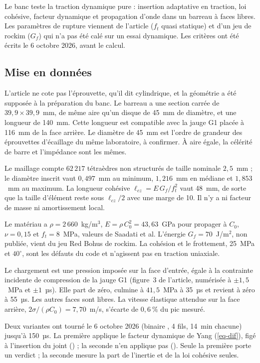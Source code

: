 Le banc teste la traction dynamique pure : insertion adaptative en traction, loi cohésive, facteur dynamique et propagation d'onde dans un barreau à faces libres. Les paramètres de rupture viennent de l'article ($f_t$ quasi statique) et d'un jeu de rockim ($G_f$) qui n'a pas été calé sur un essai dynamique. Les critères ont été écrits le 6 octobre 2026, avant le calcul.

\subsection{Mise en données}

L'article ne cote pas l'éprouvette, qu'il dit cylindrique, et la géométrie a été supposée à la préparation du banc. Le barreau a une section carrée de $39{,}9 \times 39{,}9$~mm, de même aire qu'un disque de 45~mm de diamètre, et une longueur de 140~mm. Cette longueur est compatible avec la jauge G1 placée à 116~mm de la face arrière. Le diamètre de 45~mm est l'ordre de grandeur des éprouvettes d'écaillage du même laboratoire, à confirmer. À aire égale, la célérité de barre et l'impédance sont les mêmes.

Le maillage compte $62\,217$ tétraèdres non structurés de taille nominale $2{,}5$~mm ; le diamètre inscrit vaut $0{,}497$~mm au minimum, $1{,}216$~mm en médiane et $1{,}853$~mm au maximum. La longueur cohésive $\ell_{cz} = E\,G_f/f_t^2$ vaut 48~mm, de sorte que la taille d'élément reste sous $\ell_{cz}/2$ avec une marge de 10. Il n'y a ni facteur de masse ni amortissement local.

Le matériau a $\rho = 2\,660$~kg/m$^3$, $E = \rho\,C_0^2 = 43{,}63$~GPa pour propager à $C_0$, $\nu = 0{,}15$ et $f_t = 8$~MPa, valeurs de Saadati et al. L'énergie $G_f = 70$~J/m$^2$, non publiée, vient du jeu Red Bohus de rockim. La cohésion et le frottement, 25~MPa et $40^\circ$, sont les défauts du code et n'agissent pas en traction uniaxiale.

Le chargement est une pression imposée sur la face d'entrée, égale à la contrainte incidente de compression de la jauge G1 (figure~3 de l'article, numérisée à $\pm 1{,}5$~MPa et $\pm 1$~µs). Elle part de zéro, culmine à $41{,}5$~MPa à 35~µs et revient à zéro à 55~µs. Les autres faces sont libres. La vitesse élastique attendue sur la face arrière, $2\sigma/(\rho C_0) = 7{,}70$~m/s, s'écarte de $0{,}6~\%$ du pic mesuré.

Deux variantes ont tourné le 6 octobre 2026 (binaire , 4 fils, 14~min chacune) jusqu'à 150~µs. La première applique le facteur dynamique de Yang (\cref{eq-dif}), figé à l'insertion du joint () ; la seconde n'en applique pas (). Seule la première porte un verdict ; la seconde mesure la part de l'inertie et de la loi cohésive seules.

